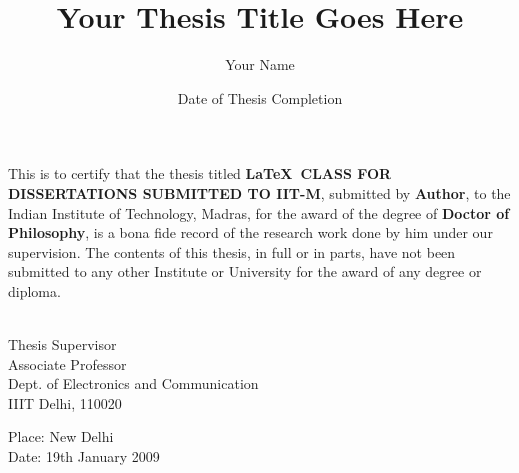 \documentclass[PhD]{iiitd}
\begin{document}

\title{Your Thesis Title Goes Here}

\author{Your Name}

\date{Date of Thesis Completion}

\maketitle

\certificate

\vspace*{0.5in}

\noindent This is to certify that the thesis titled {\bf \LaTeX\ CLASS FOR DISSERTATIONS SUBMITTED TO IIT-M}, submitted by {\bf Author}, to the Indian Institute of Technology, Madras, for the award of the degree of {\bf Doctor of Philosophy}, is a bona fide record of the research work done by him under our supervision.  The contents of this thesis, in full or in parts, have not been submitted to any other Institute or University for the award of any degree or
diploma.

\vspace*{1.5in}

\begin{singlespacing}
\hspace*{-0.25in}
\parbox{2.5in}{
 \\
\noindent Thesis Supervisor \\ 
\noindent Associate Professor \\
\noindent Dept. of Electronics and Communication\\
\noindent IIIT Delhi, 110020 \\
} 
\hspace*{1.0in} 
\end{singlespacing}
\vspace*{0.25in}
\noindent Place: New Delhi\\
Date: 19th January 2009 
\end{document}
